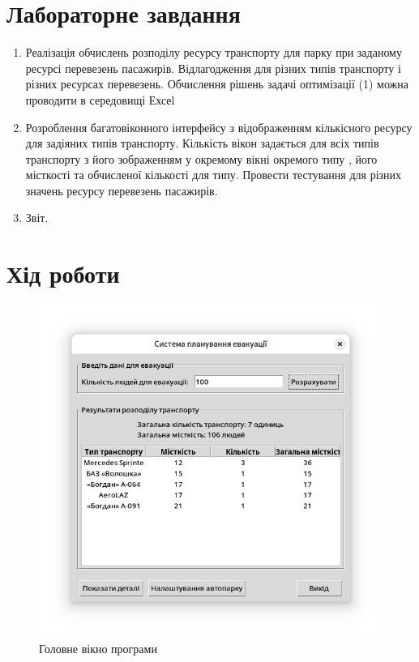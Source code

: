 \documentclass[14pt]{extreport}
\begin{document}
\begin{normalsize}
  \section*{Лабораторне завдання}
  \begin{enumerate}
  	\item Реалізація обчислень розподілу ресурсу транспорту для
парку при заданому ресурсі перевезень пасажирів. Відлагодження для
різних типів транспорту і різних ресурсах перевезень. Обчислення
рішень задачі оптимізації (1) можна проводити в середовищі Ехсеl
  \item Розроблення багатовіконного інтерфейсу з відображенням
кількісного ресурсу для задіяних типів транспорту. Кількість вікон
задається для всіх типів транспорту з його зображенням у окремому вікні
окремого типу , його місткості та обчисленої кількості для типу. Провести
тестування для різних значень ресурсу перевезень пасажирів.
\item Звіт.
  
  \end{enumerate}
  
  \section*{Хід роботи}
  
	
	\begin{figure}[H]
	  \centering
	  \includegraphics[scale=0.7, trim=0 50pt 0 50pt, clip]{1}
	  \caption{Головне вікно програми}
	\end{figure}
	

\end{normalsize}
\end{document}
